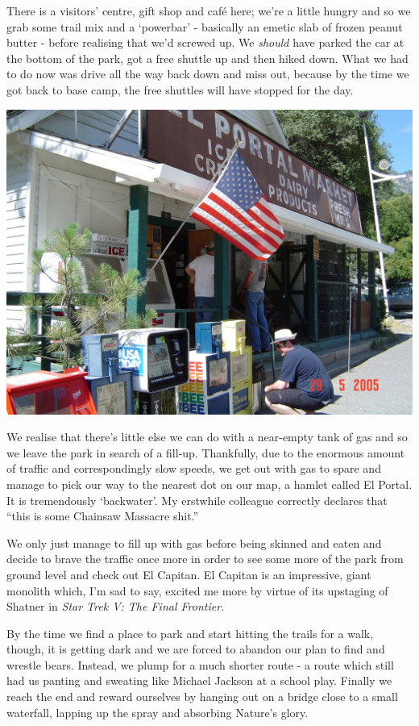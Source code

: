 \documentclass[a5paper,titlepage,11pt]{book}
\begin{document}
There is a visitors' centre, gift shop and caf\'{e} here; we're a little hungry and so we grab some trail mix and a `powerbar' - basically an emetic slab of frozen peanut butter - before realising that we'd screwed up.  We \emph{should} have parked the car at the bottom of the park, got a free shuttle up and then hiked down.  What we had to do now was drive all the way back down and miss out, because by the time we got back to base camp, the free shuttles will have stopped for the day.

\begin{center}\includegraphics[width=\textwidth]{gfx/DSC00663}\end{center}

We realise that there's little else we can do with a near-empty tank of gas and so we leave the park in search of a fill-up.  Thankfully, due to the enormous amount of traffic and correspondingly slow speeds, we get out with gas to spare and manage to pick our way to the nearest dot on our map, a hamlet called El Portal.  It is tremendously `backwater'.  My erstwhile colleague correctly declares that ``this is some Chainsaw Massacre shit.''

We only just manage to fill up with gas before being skinned and eaten and decide to brave the traffic once more in order to see some more of the park from ground level and check out El Capitan.  El Capitan is an impressive, giant monolith which, I'm sad to say, excited me more by virtue of its upstaging of Shatner in \emph{Star Trek V: The Final Frontier}.

By the time we find a place to park and start hitting the trails for a walk, though, it is getting dark and we are forced to abandon our plan to find and wrestle bears.  Instead, we plump for a much shorter route - a route which still had us panting and sweating like Michael Jackson at a school play.  Finally we reach the end and reward ourselves by hanging out on a bridge close to a small waterfall, lapping up the spray and absorbing Nature's glory.
\end{document}
